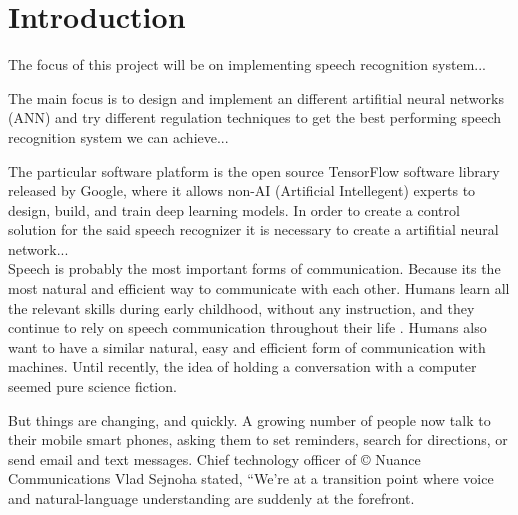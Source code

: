 \chapter{Introduction}\label{ch:introduction}

The focus of this project will be on implementing speech recognition system...

The main focus is to design and implement an different artifitial neural networks (ANN) and try different regulation techniques to get the best performing speech recognition system we can achieve...

The particular software platform is the open source TensorFlow \cite{tensorflow2015-whitepaper} software library released by Google, where it allows non-AI (Artificial Intellegent) experts to design, build, and train deep learning models. In order to create a control solution for the said speech recognizer it is necessary to create a artifitial neural network...\\

Speech is probably the most important forms of communication. Because its the most natural and efficient way to communicate with each other. Humans learn all the relevant skills during early childhood, without any instruction, and they continue to rely on speech communication throughout their life \cite{kamblespeech}. Humans also want to have a similar natural, easy and efficient form of communication with machines. Until recently, the idea of holding a conversation with a computer seemed pure science fiction.

But things are changing, and quickly. A growing number of people now talk to their mobile smart phones, asking them to set reminders, search for directions, or send email and text messages. Chief technology officer of \copyright{} Nuance Communications Vlad Sejnoha stated, “We’re at a transition point where voice and natural-language understanding are suddenly at the forefront.




\cite{kamblespeech}
 






